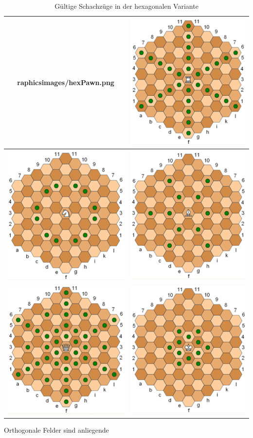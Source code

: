 \begin{table}[H]
\begin{tabular}{|c|c|}
raphics{images/hexPawn.png} & \includegraphics{images/hexRook.png} \\ \hline \includegraphics{images/hexKnight.png} & \includegraphics{images/hexBishop.png} \\ \hline \includegraphics{images/hexQueen.png} & \includegraphics{images/hexKing.png} \\ \hline
    \end{tabular}
    \caption{Gültige Schachzüge in der hexagonalen Variante \protect\footnotemark}
    \label{tab:posMove}
\end{table}
Orthogonale Felder sind anliegende 